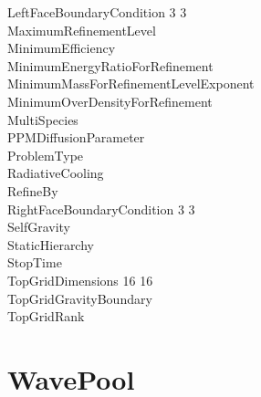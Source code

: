 \documentclass{book}
\begin{document}
{\begin{tabbing}
\> LeftFaceBoundaryCondition   3 3    \\
\> MaximumRefinementLevel         \\
\> MinimumEfficiency            \\
\> MinimumEnergyRatioForRefinement   \\
\> MinimumMassForRefinementLevelExponent  \\
\> MinimumOverDensityForRefinement   \\
\> MultiSpecies                 \\
\> PPMDiffusionParameter               \\
\> ProblemType                       \\
\> RadiativeCooling             \\
\> RefineBy                       \\
\> RightFaceBoundaryCondition  3 3 \\
\> SelfGravity                        \\
\> StaticHierarchy                \\
\> StopTime                \\
\> TopGridDimensions           16 16 \\
\> TopGridGravityBoundary             \\
\> TopGridRank                
\end{tabbing}}

\subsection{\cello}

\section{WavePool} \label{s:WavePool}

\subsection{\enzo}
\end{document}
